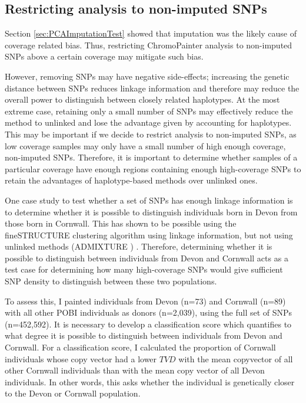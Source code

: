 {\subsection{Restricting analysis to non-imputed SNPs}

Section \ref{sec:PCAImputationTest} showed that imputation was the likely cause of coverage related bias. Thus, restricting ChromoPainter analysis to non-imputed SNPs above a certain coverage may mitigate such bias.

However, removing SNPs may have negative side-effects; increasing the genetic distance between SNPs reduces linkage information and therefore may reduce the overall power to distinguish between closely related haplotypes. At the most extreme case, retaining only a small number of SNPs may effectively reduce the method to unlinked and lose the advantage given by accounting for haplotypes. This may be important if we decide to restrict analysis to non-imputed SNPs, as low coverage samples may only have a small number of high enough coverage, non-imputed SNPs. Therefore, it is important to determine whether samples of a particular coverage have enough regions containing enough high-coverage SNPs to retain the advantages of haplotype-based methods over unlinked ones. 

One case study to test whether a set of SNPs has enough linkage information is to determine whether it is possible to distinguish individuals born in Devon from those born in Cornwall. This has shown to be possible using the fineSTRUCTURE clustering algorithm using linkage information, but not using unlinked methods (ADMIXTURE \cite{alexander2009fast}) \cite{Leslie2015}. Therefore, determining whether it is possible to distinguish between individuals from Devon and Cornwall acts as a test case for determining how many high-coverage SNPs would give sufficient SNP density to distinguish between these two populations.

To assess this, I painted individuals from Devon (n=73) and Cornwall (n=89) with all other POBI individuals as donors (n=2,039), using the full set of SNPs (n=452,592). It is necessary to develop a classification score which quantifies to what degree it is possible to distinguish between individuals from Devon and Cornwall. For a classification score, I calculated the proportion of Cornwall individuals whose copy vector had a lower $TVD$ with the mean copyvector of all other Cornwall individuals than with the mean copy vector of all Devon individuals. In other words, this asks whether the individual is genetically closer to the Devon or Cornwall population.

}
